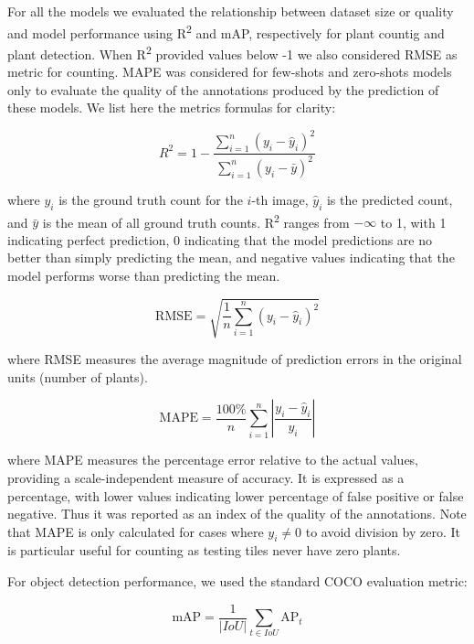 \documentclass{article}
\begin{document}
For all the models we evaluated the relationship between dataset size or quality and model performance
using R\textsuperscript{2} and mAP, respectively for plant countig and plant detection. When 
R\textsuperscript{2} provided values below -1 we also considered RMSE as metric for counting.
MAPE was considered for few-shots and zero-shots models only to evaluate the 
quality of the annotations produced by the prediction of these models.
We list here the metrics formulas for clarity:

\begin{equation}
R^2 = 1 - \frac{\sum_{i=1}^{n} (y_i - \hat{y}_i)^2}{\sum_{i=1}^{n} (y_i - \bar{y})^2}
\end{equation}

where $y_i$ is the ground truth count for the $i$-th image, $\hat{y}_i$ is the 
predicted count, and $\bar{y}$ is the mean of all ground truth counts. R\textsuperscript{2} ranges 
from $-\infty$ to 1, with 1 indicating perfect prediction, 0 indicating that the 
model predictions are no better than simply predicting the mean, and negative 
values indicating that the model performs worse than predicting the mean.

\begin{equation}
\text{RMSE} = \sqrt{\frac{1}{n}\sum_{i=1}^{n} (y_i - \hat{y}_i)^2}
\end{equation}

where RMSE measures the average magnitude of prediction errors in the original 
units (number of plants).

\begin{equation}
\text{MAPE} = \frac{100\%}{n}\sum_{i=1}^{n} \left| \frac{y_i - \hat{y}_i}{y_i} \right|
\end{equation}

where MAPE measures the percentage error relative to the actual values, providing a scale-independent 
measure of accuracy. It is expressed as a percentage, with lower values indicating lower
percentage of false positive or false negative.
Thus it was reported as an index of the quality of the annotations.
Note that MAPE is only calculated for cases where $y_i \neq 0$ to avoid division by zero.
It is particular useful for counting as testing tiles never have zero plants.

For object detection performance, we used the standard COCO evaluation metric:

\begin{equation}
\text{mAP} = \frac{1}{|IoU|}\sum_{t \in IoU}\text{AP}_t
\end{equation}
\end{document}
